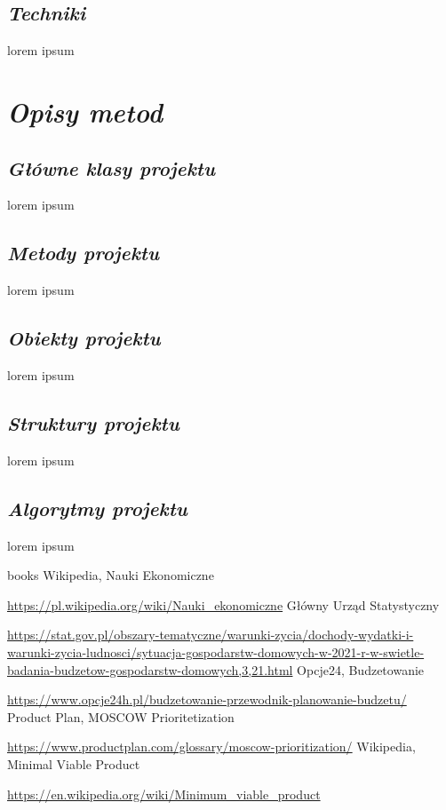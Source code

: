 \documentclass[a4paper,10pt]{report}
\newcommand{\customstylechapter}[1]{\large{\textit{#1}}}
\newcommand{\customstylesection}[1]{\textbf{\textit{#1}}}
\begin{document}
\section{\customstylesection{Techniki}}
{lorem ipsum}

\chapter{\customstylechapter{Opisy metod}}
\section{\customstylesection{Główne klasy projektu}}
{lorem ipsum}

\section{\customstylesection{Metody projektu}}
{lorem ipsum}

\section{\customstylesection{Obiekty projektu}}
{lorem ipsum}

\section{\customstylesection{Struktury projektu}}
{lorem ipsum}

\section{\customstylesection{Algorytmy projektu}}
{lorem ipsum}

\begin{thebibliography} {books}
 Wikipedia, Nauki Ekonomiczne \raggedright\url{
    https://pl.wikipedia.org/wiki/Nauki_ekonomiczne}
 Główny Urząd Statystyczny \raggedright\url{
    https://stat.gov.pl/obszary-tematyczne/warunki-zycia/dochody-wydatki-i-warunki-zycia-ludnosci/sytuacja-gospodarstw-domowych-w-2021-r-w-swietle-badania-budzetow-gospodarstw-domowych,3,21.html}
 Opcje24, Budzetowanie \raggedright\url{
    https://www.opcje24h.pl/budzetowanie-przewodnik-planowanie-budzetu/}
 Product Plan, MOSCOW Prioritetization \raggedright\url{
    https://www.productplan.com/glossary/moscow-prioritization/}
 Wikipedia, Minimal Viable Product \raggedright\url{
    https://en.wikipedia.org/wiki/Minimum_viable_product}
\end{thebibliography}

\listoffigures
\end{document}
